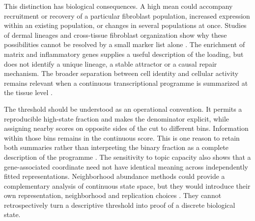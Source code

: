 This distinction has biological consequences. A high mean could accompany recruitment or recovery of a particular fibroblast population, increased expression within an existing population, or changes in several populations at once. Studies of dermal lineages and cross-tissue fibroblast organization show why these possibilities cannot be resolved by a small marker list alone \citep{driskell2013,muhl2020,buechler2021}. The enrichment of matrix and inflammatory genes supplies a useful description of the loading, but does not identify a unique lineage, a stable attractor or a causal repair mechanism. The broader separation between cell identity and cellular activity remains relevant when a continuous transcriptional programme is summarized at the tissue level \citep{kotliar2019}.

The threshold should be understood as an operational convention. It permits a reproducible high-state fraction and makes the denominator explicit, while assigning nearby scores on opposite sides of the cut to different bins. Information within those bins remains in the continuous score. This is one reason to retain both summaries rather than interpreting the binary fraction as a complete description of the programme \citep{altman2006}. The sensitivity to topic capacity also shows that a gene-associated coordinate need not have identical meaning across independently fitted representations. Neighborhood abundance methods could provide a complementary analysis of continuous state space, but they would introduce their own representation, neighborhood and replication choices \citep{dann2022}. They cannot retrospectively turn a descriptive threshold into proof of a discrete biological state.

